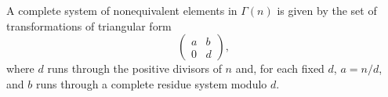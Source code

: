 A complete system of nonequivalent elements in $\Gamma(n)$ is given by the set of transformations of triangular form
$$\begin{pmatrix} a & b \\ 0 & d \end{pmatrix},$$
where $d$ runs through the positive divisors of $n$ and, for each fixed $d$, $a = n/d$, and $b$ runs through a complete residue system modulo $d$.
